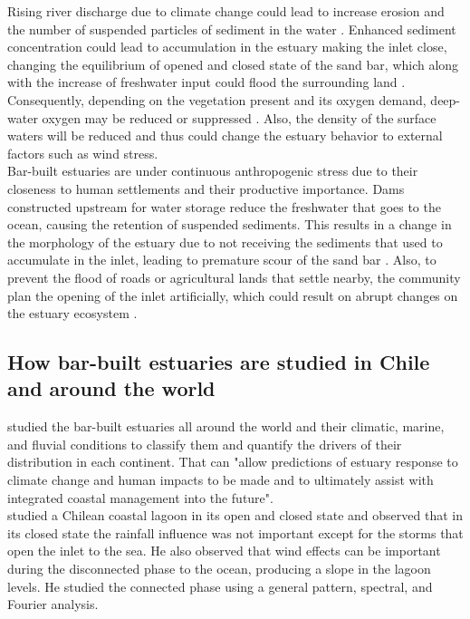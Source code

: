 \documentclass[tesis.tex]{subfiles}
\begin{document}
Rising river discharge due to climate change could lead to increase erosion and the number of suspended particles of sediment in the water \citep{whitfield1994changes}. Enhanced sediment concentration could lead to accumulation in the estuary making the inlet close, changing the equilibrium of opened and closed state of the sand bar, which along with the increase of freshwater input could flood the surrounding land \citep{peeters2009currents}. Consequently, depending on the vegetation present and its oxygen demand, deep-water oxygen may be reduced or suppressed \citep{Kelly2018, Largier2021}. Also, the density of the surface waters will be reduced and thus could change the estuary behavior to external factors such as wind stress. \\

Bar-built estuaries are under continuous anthropogenic stress due to their closeness to human settlements \citep{clark2019systematic} and their productive importance. Dams constructed upstream for water storage reduce the freshwater that goes to the ocean, causing the retention of suspended sediments. This results in a change in the morphology of the estuary due to not receiving the sediments that used to accumulate in the inlet, leading to premature scour of the sand bar \citep{peeters2009currents}. Also, to prevent the flood of roads or agricultural lands that settle nearby, the community plan the opening of the inlet artificially, which could result on abrupt changes on the estuary ecosystem \cite{Behrens2013}. \\

\subsection{How bar-built estuaries are studied in Chile and around the world}

\cite{mcsweeney2017intermittently} studied the bar-built estuaries all around the world and their climatic, marine, and fluvial conditions to classify them and quantify the drivers of their distribution in each continent. That can "allow predictions of estuary response to climate change and human impacts to be made and to ultimately assist with integrated coastal management into the future".\\

\cite{dussaillant2009} studied a Chilean coastal lagoon in its open and closed state and observed that in its closed state the rainfall influence was not important except for the storms that open the inlet to the sea. He also observed that wind effects can be important during the disconnected phase to the ocean, producing a slope in the lagoon levels. He studied the connected phase using a general pattern, spectral, and Fourier analysis.\\
\end{document}
